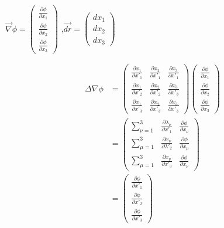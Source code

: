 \documentclass[12]{article}
\begin{document}
 $\vec{\nabla} \phi=\begin{pmatrix}
 \frac{\partial \phi}{\partial x_{1}}\\
 \frac{\partial \phi}{\partial x_{2}}\\
 \frac{\partial \phi}{\partial x_{3}}
 \end{pmatrix}$ \hspace{5mm} ,$\vec{dr}=\begin{pmatrix}
 dx_{1}\\
 dx_{2}\\
 dx_{3}
 \end{pmatrix}$\\
 
 \vspace{1cm}
 
 \begin{align*}
 \Delta \nabla \phi & =\begin{pmatrix}
\frac{\partial x_{1}}{\partial x'_{1}}&
\frac{\partial x_{2}}{\partial x'_{1}}&
\frac{\partial x_{3}}{\partial x'_{1}}\\
\frac{\partial x_{1}}{\partial x'_{2}}&\frac{\partial x_{2}}{\partial x'_{2}}&\frac{\partial x_{3}}{\partial x'_{3}}\\
\frac{\partial x_{1}}{\partial x'_{3}}&\frac{\partial x_{2}}{\partial x'_{3}}&\frac{\partial x_{3}}{\partial x'_{3}}
 \end{pmatrix}
 \begin{pmatrix}
 \frac{\partial \phi}{\partial x_{1}}\\
 \frac{\partial \phi}{\partial x_{2}}\\
 \frac{\partial \phi}{\partial x_{3}}
 \end{pmatrix}\\
 & =\begin{pmatrix}
 \sum_{\nu =1}^{3}&\frac{\partial \lambda_{\nu}}{\partial x'_{1}}&\frac{\partial \phi}{\partial x_{\nu}}\\
\sum_{\mu =1}^{3}&\frac{\partial x_{\nu}}{\partial \lambda'_{2}}&\frac{\partial \phi}{\partial x_{\mu}}\\ 
\sum_{\mu =1}^{3}&\frac{\partial x_{\nu}}{\partial x'_{3}}&\frac{\partial \phi}{\partial x_{\nu}}
\end{pmatrix}\\
& =\begin{pmatrix}
\frac{\partial \phi}{\partial x'_{1}}\\
\frac{\partial \phi}{\partial x'_{2}}\\
\frac{\partial \phi}{\partial x'_{3}}
\end{pmatrix}
\end{align*}
\end{document}
